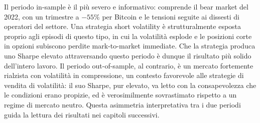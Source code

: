 Il periodo in-sample è il più severo e informativo: comprende il bear
market del 2022, con un trimestre a $-55\%$ per Bitcoin e le tensioni
seguite ai dissesti di operatori del settore. Una strategia short
volatility è strutturalmente esposta proprio agli episodi di questo tipo, in
cui la volatilità esplode e le posizioni corte in opzioni subiscono perdite
mark-to-market immediate. Che la strategia produca uno Sharpe elevato
attraversando questo periodo è dunque il risultato più solido dell'intero
lavoro. Il periodo out-of-sample, al contrario, è un mercato fortemente
rialzista con volatilità in compressione, un contesto favorevole alle
strategie di vendita di volatilità: il suo Sharpe, pur elevato, va letto
con la consapevolezza che le condizioni erano propizie, ed è
verosimilmente sovrastimato rispetto a un regime di mercato neutro. Questa
asimmetria interpretativa tra i due periodi guida la lettura dei risultati
nei capitoli successivi.
